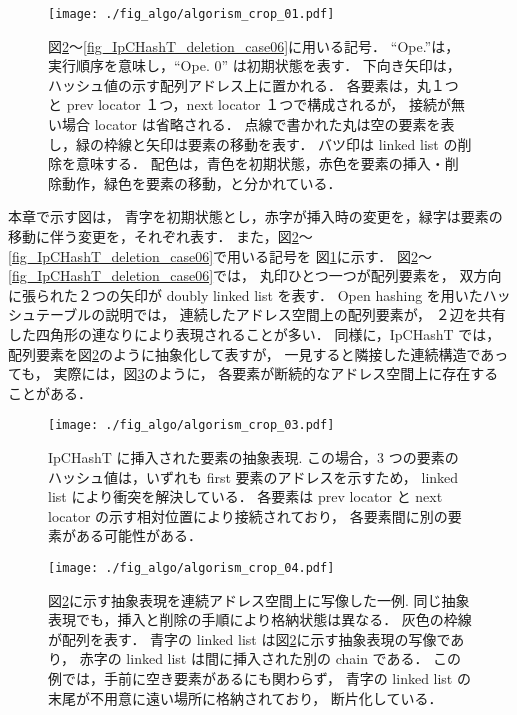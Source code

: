 \begin{figure}
  \texttt{[image: ./fig\_algo/algorism\_crop\_01.pdf]}
  \caption{
    図\ref{fig_IpCHashT_apparence}〜\ref{fig_IpCHashT_deletion_case06}に用いる記号．
    ``Ope.''は，実行順序を意味し，``Ope. 0'' は初期状態を表す．
    下向き矢印は，ハッシュ値の示す配列アドレス上に置かれる．
    各要素は，丸１つと prev locator １つ，next locator １つで構成されるが，
    接続が無い場合 locator は省略される．
    点線で書かれた丸は空の要素を表し，緑の枠線と矢印は要素の移動を表す．
    バツ印は linked list の削除を意味する．
    配色は，青色を初期状態，赤色を要素の挿入・削除動作，緑色を要素の移動，と分かれている．
  }
  \label{fig_IpCHashT_fig_description}
\end{figure}

本章で示す図は，
青字を初期状態とし，赤字が挿入時の変更を，緑字は要素の移動に伴う変更を，それぞれ表す．
また，図\ref{fig_IpCHashT_apparence}〜\ref{fig_IpCHashT_deletion_case06}で用いる記号を
図\ref{fig_IpCHashT_fig_description}に示す．
図\ref{fig_IpCHashT_apparence}〜\ref{fig_IpCHashT_deletion_case06}では，
丸印ひとつ一つが配列要素を，
双方向に張られた２つの矢印が doubly linked list を表す．
Open hashing を用いたハッシュテーブルの説明では，
連続したアドレス空間上の配列要素が，
２辺を共有した四角形の連なりにより表現されることが多い．
同様に，IpCHashT では，配列要素を図\ref{fig_IpCHashT_apparence}のように抽象化して表すが，
一見すると隣接した連続構造であっても，
実際には，図\ref{fig_IpCHashT_insert_introspection}のように，
各要素が断続的なアドレス空間上に存在することがある．

\begin{figure}
  \texttt{[image: ./fig\_algo/algorism\_crop\_03.pdf]}
  \caption{
    IpCHashT に挿入された要素の抽象表現.
    この場合，3 つの要素のハッシュ値は，いずれも first 要素のアドレスを示すため，
    linked list により衝突を解決している．
    各要素は prev locator と next locator の示す相対位置により接続されており，
    各要素間に別の要素がある可能性がある．
  }
  \label{fig_IpCHashT_apparence}
\end{figure}

\begin{figure}
  \texttt{[image: ./fig\_algo/algorism\_crop\_04.pdf]}
  \caption{
    図\ref{fig_IpCHashT_apparence}に示す抽象表現を連続アドレス空間上に写像した一例.
    同じ抽象表現でも，挿入と削除の手順により格納状態は異なる．
    灰色の枠線が配列を表す．
    青字の linked list は図\ref{fig_IpCHashT_apparence}に示す抽象表現の写像であり，
    赤字の linked list は間に挿入された別の chain である．
    この例では，手前に空き要素があるにも関わらず，
    青字の linked list の末尾が不用意に遠い場所に格納されており，
    断片化している．
  }
  \label{fig_IpCHashT_insert_introspection}
\end{figure}

